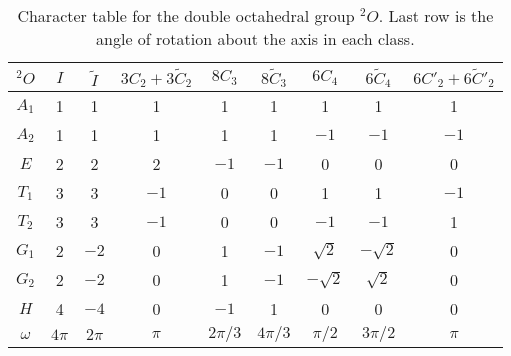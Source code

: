\documentclass[aps,prd,reprint,showpacs,floatfix,longbibliography,,superscriptaddress]{revtex4-1}
\begin{document}
\begin{widetext}
%
\begin{table}
\begin{tabular}{c| c c c c c c c c}\toprule
$^2O$    & $I$    & $\widetilde{I}$ & $3C_2+3\widetilde{C}_2$& $8C_3$   & $8\widetilde{C}_3$  & $6C_4$      & $6\widetilde{C}_4$ & $6C'_2+6\widetilde{C}'_2$ \\
\hline                                                                                                                                                      
$A_{1}$  & 1      & 1               & 1                      & 1        & 1                   & 1           & 1                  & 1                         \\
$A_{2}$  & 1      & 1               & 1                      & 1        & 1                   & $-1$        & $-1$               & $-1$                      \\
$E$      & 2      & 2               & 2                      & $-1$     & $-1$                & 0           & 0                  & 0                         \\
$T_1$    & 3      & 3               & $-1$                   & 0        & 0                   & 1           & 1                  & $-1$                      \\
$T_2 $   & 3      & 3               & $-1$                   & 0        & 0                   & $-1$        & $-1$               & 1                         \\
\hline                                                                                                                                                      
$G_1$    & 2      & $-2$            & 0                      & 1        & $-1$                & $\sqrt{2}$  & $-\sqrt{2}$        & 0                         \\
$G_2$    & 2      & $-2$            & 0                      & 1        & $-1$                & $-\sqrt{2}$ & $\sqrt{2}$         & 0                         \\
$H $     & 4      & $-4$            & 0                      & $-1$     &1                    & 0           & 0                  & 0                         \\
\hline                                                                                                                                                      
$\omega$ & $4\pi$ & $2\pi$          & $\pi$                  & $2\pi/3$ & $4\pi/3$            & $\pi/2$     & $3\pi/2$           & $\pi$                     \\
\bottomrule
\end{tabular}
\caption{Character table for the double octahedral group $^2O$. Last row is the angle of rotation about the axis in each class.}
\label{tab:char2O}
\end{table}
%



\end{widetext}
\end{document}
